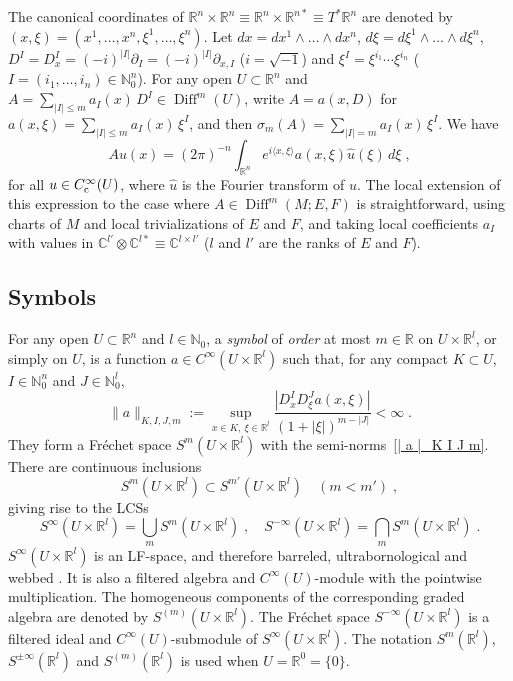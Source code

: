 \documentclass{memo-l}
\theoremstyle{plain}
\theoremstyle{definition}
\theoremstyle{remark}
\newcommand{\C}{\mathbb{C}}
\newcommand{\N}{\mathbb{N}}
\newcommand{\R}{\mathbb{R}}
\newcommand{\Diff}{\operatorname{Diff}}
\newcommand{\Cinftyc}{C^\infty_{\text{\rm c}}}
\numberwithin{section}{chapter}
\numberwithin{equation}{section}%
\begin{document}
The canonical coordinates of $\R^n\times\R^n\equiv\R^n\times\R^{n*}\equiv T^*\R^n$ are denoted by $(x,\xi)=(x^1,\dots,x^n,\xi^1,\dots,\xi^n)$. Let $dx=dx^1\wedge\dots\wedge dx^n$, $d\xi=d\xi^1\wedge\dots\wedge d\xi^n$, $D^I=D_x^I=(-i)^{|I|}\partial_I=(-i)^{|I|}\partial_{x,I}$ ($i=\sqrt{-1}$) and $\xi^I=\xi^{i_1}\cdots\xi^{i_n}$ ($I=(i_1,\dots,i_n)\in\N_0^n$). For any open $U\subset\R^n$ and $A=\sum_{|I|\le m}a_I(x)\,D^I\in\Diff^m(U)$, write $A=a(x,D)$ for $a(x,\xi)=\sum_{|I|\le m}a_I(x)\,\xi^I$, and then $\sigma_m(A)=\sum_{|I|=m}a_I(x)\,\xi^I$. We have
\begin{equation}\label{Au(x) = ...}
Au(x)=(2\pi)^{-n}\int_{\R^n}e^{i\langle x,\xi\rangle}a(x,\xi)\hat u(\xi)\,d\xi\;,
\end{equation}
for all $u\in\Cinftyc(U)$, where $\hat u$ is the Fourier transform of $u$. The local extension of this expression to the case where $A\in\Diff^m(M;E,F)$ is straightforward, using charts of $M$ and local trivializations of $E$ and $F$, and taking local coefficients $a_I$ with values in $\C^{l'}\otimes\C^{l*}\equiv\C^{l\times l'}$ ($l$ and $l'$ are the ranks of $E$ and $F$). 



\subsection{Symbols}\label{ss: symbols}

For any open $U\subset\R^n$ and $l\in\N_0$, a \emph{symbol} of \emph{order} at most $m\in\R$ on $U\times\R^l$, or simply on $U$, is a function $a\in C^\infty(U\times\R^l)$ such that, for any compact $K\subset U$, $I\in\N_0^n$ and $J\in\N_0^l$,
\begin{equation}\label{| a |_K I J m}
\|a\|_{K,I,J,m}:=\sup_{x\in K,\ \xi\in\R^l}\frac{|D_x^I D_\xi^J a(x,\xi)|}{(1+|\xi|)^{m-|J|}}<\infty\;.
\end{equation}
They form a Fr\'echet space $S^m(U\times\R^l)$ with the semi-norms~\eqref{| a |_K I J m}. There are continuous inclusions
\begin{equation}\label{S^m(T^*M) subset S^m'(T^*M)}
S^m(U\times\R^l)\subset S^{m'}(U\times\R^l)\quad(m<m')\;,
\end{equation}
giving rise to the LCSs
\[
S^\infty(U\times\R^l)=\bigcup_mS^m(U\times\R^l)\;,\quad S^{-\infty}(U\times\R^l)=\bigcap_mS^m(U\times\R^l)\;.
\]
$S^\infty(U\times\R^l)$ is an LF-space, and therefore barreled, ultrabornological and webbed \cite[Proposition~3.1]{AlvKordyLeichtnam-conormal}. It is also a filtered algebra and $C^\infty(U)$-module with the pointwise multiplication. The homogeneous components of the corresponding graded algebra are denoted by $S^{(m)}(U\times\R^l)$. \index{$S^{(m)}(U\times\R^l)$} The Fr\'echet space $S^{-\infty}(U\times\R^l)$ is a filtered ideal and $C^\infty(U)$-submodule of $S^\infty(U\times\R^l)$.
The notation $S^m(\R^l)$, $S^{\pm\infty}(\R^l)$ and $S^{(m)}(\R^l)$ is used when $U=\R^0=\{0\}$.
\end{document}
